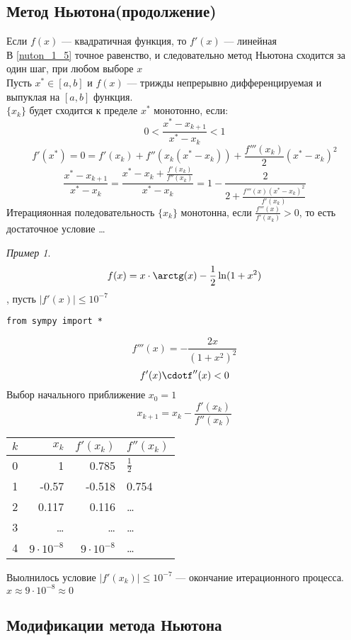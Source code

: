 \documentclass[english]{article}
\theoremstyle{plain}
\theoremstyle{remark}
\newtheorem*{examp}{Пример}
\theoremstyle{definition}
\begin{document}
\subsection{Метод Ньютона(продолжение)}
\label{sec:org0398faf}
Если \(f(x)\) --- квадратичная функция, то \(f'(x)\) --- линейная \\
В \ref{nuton_1_5} точное равенство, и следовательно метод Ньютона
сходится за один шаг, при любом выборе \(x\) \\
Пусть \(x^* \in [a, b]\) и \(f(x)\) --- трижды непрерывно дифференцируемая и выпуклая на \([a, b]\) функция. \\
\(\{x_k\}\) будет сходится к пределе \(x^*\) монотонно, если:
\[ 0<\frac{x^* - x_{k+1}}{x^* - x_k} < 1 \]
\[ f'(x^*) = 0 = f'(x_k) + f''(x_k(x^* - x_k)) + \frac{f'''(x_k)}{2}(x^* - x_k)^2 \]
\[ \frac{x^* - x_{k + 1}}{x^* - x_k} = \frac{x^* - x_k + \frac{f'(x_k)}{f''(x_k)}}{x^* - x_k} = 1 - \frac{2}{2 + \frac{f'''(x)(x^* - x_k)^2}{f'(x_k)}}\]
Итерацияонная поледовательность \(\{x_k\}\) монотонна, если \(\frac{f'''(x)}{f'(x_k)} > 0\),
то есть достаточное условие \color{red}\dots{}\color{black}

\begin{examp}
\[ f(x) = x\cdot\arctg(x) - \frac{1}{2}\ln(1 + x^2) \]
, пусть \(|f'(x)| \le 10^{-7}\)
\begin{verbatim}
from sympy import *
\end{verbatim}

\[ f'''(x) = -\frac{2x}{(1 + x^2)^2} \]
\[ f'(x)\cdotf''(x) < 0 \]
Выбор начального приближение \(x_0 = 1\)
\[ x_{k + 1} = x_k - \frac{f'(x_k)}{f''(x_k)} \]
\begin{center}
\begin{tabular}{r|rrl|}
\(k\) & \(x_k\) & \(f'(x_k)\) & \(f''(x_k)\)\\
\hline
0 & 1 & 0.785 & \(\frac{1}{2}\)\\
1 & -0.57 & -0.518 & 0.754\\
2 & 0.117 & 0.116 & \dots{}\\
3 & \dots{} & \dots{} & \dots{}\\
4 & \(9\cdot 10^{-8}\) & \(9\cdot10^{-8}\) & \dots{}\\
\end{tabular}
\end{center}
Выолнилось условие \(|f'(x_k)| \le 10^{-7}\) --- окончание итерационного процесса. \(x \approx 9\cdot 10^{-8} \approx 0\)
\end{examp}
\subsection{Модификации метода Ньютона}
\label{sec:org24151ce}
\end{document}
